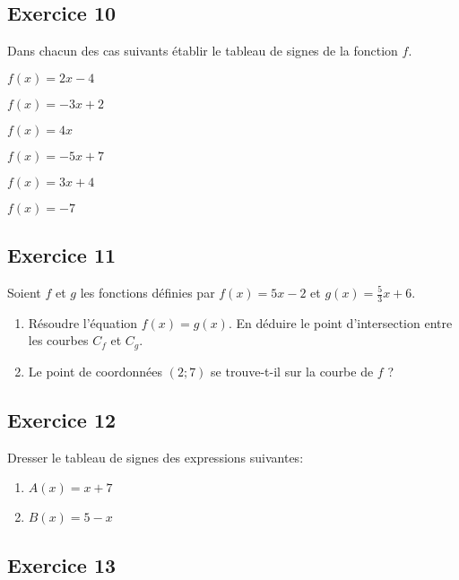 \documentclass[12pt,a4paper]{article}
\begin{document}
\subsection*{Exercice 10}
Dans chacun des cas suivants établir le tableau de signes de la fonction $f$.

\begin{enumerate}
\begin{minipage}[c]{0.4\linewidth}
\item $f(x)=2x-4$
\item $f(x)=-3x+2$
\end{minipage}
\begin{minipage}[c]{0.4\linewidth}
\item $f(x)=4x$
\item $f(x)=-5x+7$
\end{minipage}
\begin{minipage}[c]{0.4\linewidth}
\item $f(x)=3x+4$ 
\item $f(x)=-7$
\end{minipage}
\end{enumerate}


\subsection*{Exercice 11}
Soient $f$ et $g$ les fonctions définies par $f(x)=5x-2$ et $g(x)=\frac{5}{3}x+6$.\medskip
\begin{enumerate}
\item Résoudre l'équation $f(x)=g(x)$. En déduire le point d'intersection entre les courbes $C_{f}$ et $C_{g}$.\medskip
\item Le point de coordonnées $(2;7)$ se trouve-t-il sur la courbe de $f$ ?\medskip 
\end{enumerate}

\subsection*{Exercice 12}

Dresser le tableau de signes des expressions suivantes:
\begin{enumerate}
    \item $A(x)=x+7$
    \item $B(x)=5-x$
\end{enumerate}


\subsection*{Exercice 13}
\end{document}
